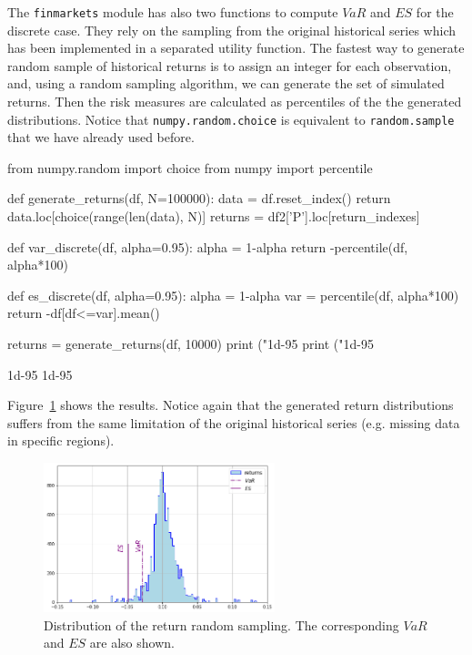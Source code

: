 \begin{finmarkets}
The \texttt{finmarkets} module has also two functions to compute $VaR$ and $ES$ for the discrete case. 
They rely on the sampling from the original historical series which has been implemented in a separated utility function. The fastest way to generate random sample of historical returns is to assign an integer for each observation, and, using a random sampling algorithm, we can generate the set of simulated returns. Then the risk measures are calculated as percentiles of the the generated distributions. Notice that \texttt{numpy.random.choice} is equivalent to \texttt{random.sample} that we have already used before.
\end{finmarkets}

\begin{ipython}
from numpy.random import choice
from numpy import percentile

def generate_returns(df, N=100000):
    data = df.reset_index()
    return data.loc[choice(range(len(data), N)]
    returns = df2['P'].loc[return_indexes]

def var_discrete(df, alpha=0.95):
    alpha = 1-alpha
    return -percentile(df, alpha*100)
    
def es_discrete(df, alpha=0.95):
    alpha = 1-alpha
    var = percentile(df, alpha*100)	
    return -df[df<=var].mean()
    
returns = generate_returns(df, 10000)
print ("1d-95%
print ("1d-95%
\end{ipython}
\begin{ioutput}
1d-95%
1d-95%
\end{ioutput}

Figure~\ref{fig:historical_var} shows the results. Notice again that the generated return distributions suffers from the same limitation of the original historical series (e.g. missing data in specific regions).

\begin{figure}[htb]
\centering
\includegraphics[width=0.6\textwidth]{figures/historical_var}
\caption{Distribution of the return random sampling. The corresponding $VaR$ and $ES$ are also shown.}
\label{fig:historical_var}
\end{figure}

